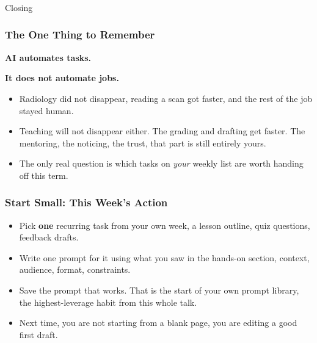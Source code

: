 \begin{frame}[fragile]\frametitle{}
\begin{center}
{\Large Closing}
\end{center}
\end{frame}

\begin{frame}[fragile]\frametitle{The One Thing to Remember}
\begin{center}
\Large
\textbf{AI automates tasks.}

\medskip
\textbf{It does not automate jobs.}
\end{center}

\medskip
\begin{itemize}
\item Radiology did not disappear, reading a scan got faster, and the rest of the job stayed human.
\item Teaching will not disappear either. The grading and drafting get faster. The mentoring, the noticing, the trust, that part is still entirely yours.
\item The only real question is which tasks on \emph{your} weekly list are worth handing off this term.
\end{itemize}
\end{frame}

\begin{frame}[fragile]\frametitle{Start Small: This Week's Action}
\begin{itemize}
\item Pick \textbf{one} recurring task from your own week, a lesson outline, quiz questions, feedback drafts.
\item Write one prompt for it using what you saw in the hands-on section, context, audience, format, constraints.
\item Save the prompt that works. That is the start of your own prompt library, the highest-leverage habit from this whole talk.
\item Next time, you are not starting from a blank page, you are editing a good first draft.
\end{itemize}
\end{frame}

